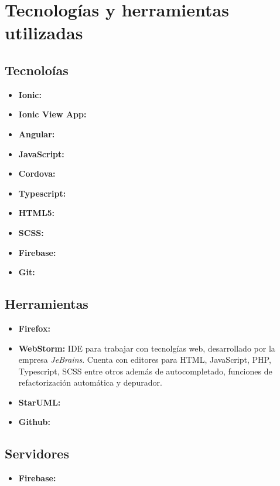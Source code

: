 \section{Tecnologías y herramientas utilizadas}
\subsection{Tecnoloías}
\begin{itemize}
    \item\textbf{Ionic:}
    \item\textbf{Ionic View App:}
    \item\textbf{Angular:}
    \item\textbf{JavaScript:}
    \item\textbf{Cordova:}
    \item\textbf{Typescript:}
    \item\textbf{HTML5:}
    \item\textbf{SCSS:}
    \item\textbf{Firebase:}
    \item\textbf{Git:}
\end{itemize}

\subsection{Herramientas}
\begin{itemize}
    \item\textbf{Firefox:}
    \item\textbf{WebStorm:} IDE para trabajar con tecnolgías web, desarrollado por la empresa
    \textit{JeBrains}\cite{jetbrains}. Cuenta con editores para HTML, JavaScript, PHP,
    Typescript, SCSS entre otros además de autocompletado, funciones de refactorización
    automática y depurador.
    \item\textbf{StarUML:}
    \item\textbf{Github:}
\end{itemize}

\subsection{Servidores}
\begin{itemize}
    \item\textbf{Firebase:}
\end{itemize}
